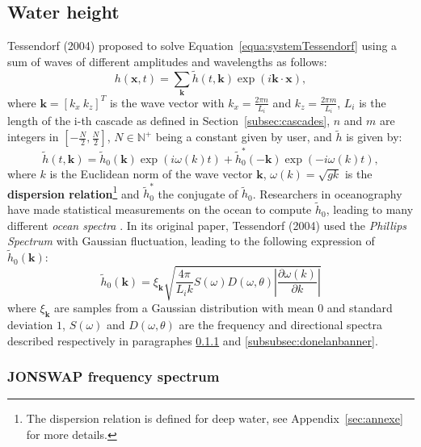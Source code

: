 \documentclass[final]{jcgt}
\begin{document}
\subsection{Water height}
\label{subsec:waterHeight}
Tessendorf (2004) \cite{tessendorfSimulatingOceanWater1999} proposed to solve Equation~\ref{equa:systemTessendorf} using a sum of waves of different amplitudes and wavelengths as follows:
\begin{equation}
	\label{equa:heightWater}
	h(\mathbf x,t)=\sum_{\mathbf{k}} \tilde{h}(t, \mathbf{k}) \exp\left( i \mathbf{k}\cdot \mathbf x\right),
\end{equation}
where $\mathbf{k}=\left[k_x\ k_z\right]^T$ is the wave vector with $k_x=\frac{2\pi n}{L_{i}}$ and $k_z=\frac{2\pi m}{L_{i}}$, $L_i$ is the length of the i-th cascade as defined in Section~\ref{subsec:cascades}, $n$ and $m$ are integers in $\left[-\frac{N}{2},\frac{N}{2}\right]$, $N\in\mathbb N^+$ being a constant given by user, and $\tilde{h}$ is given by:
\begin{equation}
	\label{equa:heightWaterBis}
	\tilde{h}(t, \mathbf{k}) = \tilde{h}_0(\mathbf{k})\exp(i\omega(k)t)+\tilde{h}_0^*(-\mathbf{k})\exp(-i\omega(k)t),
\end{equation}
where $k$ is the Euclidean norm of the wave vector $\mathbf{k}$, $\omega(k)=\sqrt{gk}$ is the \textbf{dispersion relation}\footnote{The dispersion relation is defined for deep water, see Appendix~\ref{sec:annexe} for more details.} and $\tilde{h}_0^*$ the conjugate of $\tilde{h}_0$.
Researchers in oceanography have made statistical measurements on the ocean to compute $\tilde{h}_0$, leading to many different \textit{ocean spectra} \cite{tessendorfGilliganPrototypeFramework2017}.
In its original paper, Tessendorf (2004) \cite{tessendorfSimulatingOceanWater1999} used the \textit{Phillips Spectrum} with Gaussian fluctuation, leading to the following expression of $\tilde{h}_0(\mathbf{k})$:
\begin{equation}
	\tilde{h}_0(\mathbf{k}) = \xi_{\mathbf{k}}\sqrt{\frac{4\pi}{L_ik}S(\omega)D(\omega, \theta)\left|\frac{\partial\omega(k)}{\partial k}\right|}
\end{equation}
where $\xi_{\mathbf{k}}$ are samples from a Gaussian distribution with mean $0$ and standard deviation $1$, $S(\omega)$ and $D(\omega, \theta)$ are the frequency and directional spectra described respectively in paragraphes \ref{subsubsec:jonswap} and \ref{subsubsec:donelanbanner}.

\subsubsection{JONSWAP frequency spectrum}
\label{subsubsec:jonswap}
\end{document}
